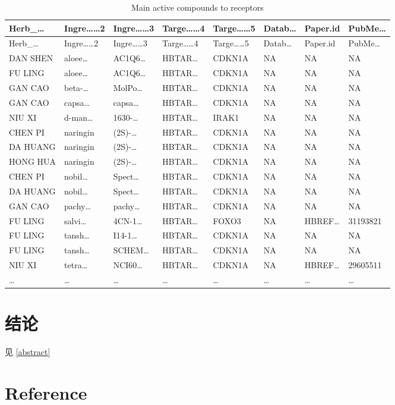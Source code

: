 \documentclass[
]{article}
\begin{document}
\begin{longtable}[]{@{}llllllll@{}}
\caption{\label{tab:main-active-compounds-to-receptors}Main active compounds to receptors}\tabularnewline
\toprule
Herb\_\ldots{} & Ingre\ldots\ldots2 & Ingre\ldots\ldots3 & Targe\ldots\ldots4 & Targe\ldots\ldots5 & Datab\ldots{} & Paper.id & PubMe\ldots{}\tabularnewline
\midrule
\endfirsthead
\toprule
Herb\_\ldots{} & Ingre\ldots\ldots2 & Ingre\ldots\ldots3 & Targe\ldots\ldots4 & Targe\ldots\ldots5 & Datab\ldots{} & Paper.id & PubMe\ldots{}\tabularnewline
\midrule
\endhead
DAN SHEN & aloee\ldots{} & AC1Q6\ldots{} & HBTAR\ldots{} & CDKN1A & NA & NA & NA\tabularnewline
FU LING & aloee\ldots{} & AC1Q6\ldots{} & HBTAR\ldots{} & CDKN1A & NA & NA & NA\tabularnewline
GAN CAO & beta-\ldots{} & MolPo\ldots{} & HBTAR\ldots{} & CDKN1A & NA & NA & NA\tabularnewline
GAN CAO & capsa\ldots{} & capsa\ldots{} & HBTAR\ldots{} & CDKN1A & NA & NA & NA\tabularnewline
NIU XI & d-man\ldots{} & 1630-\ldots{} & HBTAR\ldots{} & IRAK1 & NA & NA & NA\tabularnewline
CHEN PI & naringin & (2S)-\ldots{} & HBTAR\ldots{} & CDKN1A & NA & NA & NA\tabularnewline
DA HUANG & naringin & (2S)-\ldots{} & HBTAR\ldots{} & CDKN1A & NA & NA & NA\tabularnewline
HONG HUA & naringin & (2S)-\ldots{} & HBTAR\ldots{} & CDKN1A & NA & NA & NA\tabularnewline
CHEN PI & nobil\ldots{} & Spect\ldots{} & HBTAR\ldots{} & CDKN1A & NA & NA & NA\tabularnewline
DA HUANG & nobil\ldots{} & Spect\ldots{} & HBTAR\ldots{} & CDKN1A & NA & NA & NA\tabularnewline
GAN CAO & pachy\ldots{} & pachy\ldots{} & HBTAR\ldots{} & CDKN1A & NA & NA & NA\tabularnewline
FU LING & salvi\ldots{} & 4CN-1\ldots{} & HBTAR\ldots{} & FOXO3 & NA & HBREF\ldots{} & 31193821\tabularnewline
FU LING & tansh\ldots{} & I14-1\ldots{} & HBTAR\ldots{} & CDKN1A & NA & NA & NA\tabularnewline
FU LING & tansh\ldots{} & SCHEM\ldots{} & HBTAR\ldots{} & CDKN1A & NA & NA & NA\tabularnewline
NIU XI & tetra\ldots{} & NCI60\ldots{} & HBTAR\ldots{} & CDKN1A & NA & HBREF\ldots{} & 29605511\tabularnewline
\ldots{} & \ldots{} & \ldots{} & \ldots{} & \ldots{} & \ldots{} & \ldots{} & \ldots{}\tabularnewline
\bottomrule
\end{longtable}

\hypertarget{dis}{%
\section{结论}\label{dis}}

见 \ref{abstract}

\hypertarget{bibliography}{%
\section*{Reference}\label{bibliography}}
\end{document}
